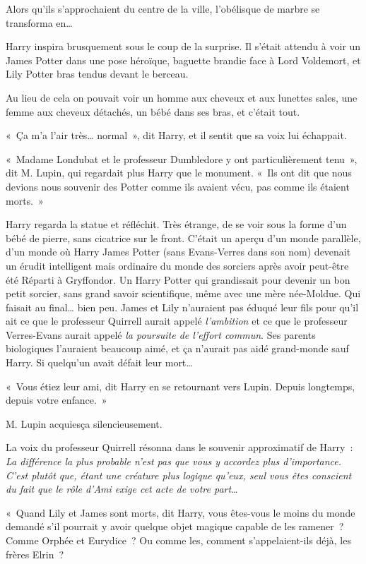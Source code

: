 Alors qu'ils s'approchaient du centre de la ville, l'obélisque de marbre se transforma en…

Harry inspira brusquement sous le coup de la surprise.
Il s'était attendu à voir un James Potter dans une pose héroïque, baguette brandie face à Lord Voldemort, et Lily Potter bras tendus devant le berceau.

Au lieu de cela on pouvait voir un homme aux cheveux et aux lunettes sales, une femme aux cheveux détachés, un bébé dans ses bras, et c'était tout.

«~Ça m'a l'air très… normal~», dit Harry, et il sentit que sa voix lui échappait.

«~Madame Londubat et le professeur Dumbledore y ont particulièrement tenu~», dit M. Lupin, qui regardait plus Harry que le monument.
«~Ils ont dit que nous devions nous souvenir des Potter comme ils avaient vécu, pas comme ils étaient morts.~»

Harry regarda la statue et réfléchit.
Très étrange, de se voir sous la forme d'un bébé de pierre, sans cicatrice sur le front.
C'était un aperçu d'un monde parallèle, d'un monde où Harry James Potter (sans Evans-Verres dans son nom) devenait un érudit intelligent mais ordinaire du monde des sorciers après avoir peut-être été Réparti à Gryffondor.
Un Harry Potter qui grandissait pour devenir un bon petit sorcier, sans grand savoir scientifique, même avec une mère née-Moldue.
Qui faisait au final… bien peu.
James et Lily n'auraient pas éduqué leur fils pour qu'il ait ce que le professeur Quirrell aurait appelé \emph{l'ambition} et ce que le professeur Verres-Evans aurait appelé \emph{la poursuite de l'effort commun}.
Ses parents biologiques l'auraient beaucoup aimé, et ça n'aurait pas aidé grand-monde sauf Harry.
Si quelqu'un avait défait leur mort…

«~Vous étiez leur ami, dit Harry en se retournant vers Lupin.
Depuis longtemps, depuis votre enfance.~»

M. Lupin acquiesça silencieusement.

La voix du professeur Quirrell résonna dans le souvenir approximatif de Harry~: \emph{La différence la plus probable n'est pas que vous y accordez plus d'importance.
C'est plutôt que, étant une créature plus logique qu'eux, seul vous êtes conscient du fait que le rôle d'Ami exige cet acte de votre part…}

«~Quand Lily et James sont morts, dit Harry, vous êtes-vous le moins du monde demandé s'il pourrait y avoir quelque objet magique capable de les ramener~?
Comme Orphée et Eurydice~?
Ou comme les, comment s'appelaient-ils déjà, les frères Elrin~?


